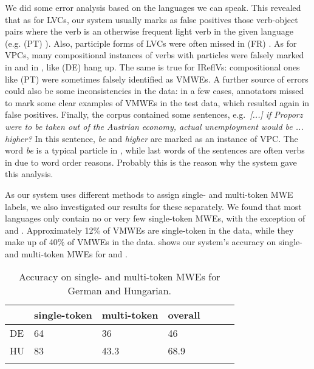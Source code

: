\documentclass[output=paper,modfonts]{langscibook}
\begin{document}
We did some error analysis based on the languages we can speak. This revealed that as for LVCs, our system usually marks as false positives those verb-object pairs where the verb is an otherwise frequent light verb in the given language (e.g. (PT) ). Also, participle forms of LVCs were often missed in (FR) . As for VPCs, many compositional instances of verbs with particles were falsely marked in  and in , like (DE)  {hang up}. The same is true for IReflVs: compositional ones like (PT)  were sometimes falsely identified as VMWEs. A further source of errors could also be some inconsistencies in the data: in a few cases, annotators missed to mark some clear examples of VMWEs in the test data, which resulted again in false positives. Finally, the  corpus contained some  sentences, e.g.~\textit{[...] if Proporz were to be taken out of the Austrian economy, actual unemployment would be ... higher?} In this sentence, \textit{be} and \textit{higher} are marked as an instance of VPC. The word \textit{be} is a typical particle in , while last words of the sentences are often verbs in  due to word order reasons. Probably this is the reason why the system gave this analysis.

As our system uses different methods to assign single- and multi-token MWE labels, we also investigated our results for these separately. We found that most languages only contain no or very few single-token MWEs, with the exception of  and . Approximately 12\% of VMWEs are single-token in the  data, while they make up of 40\% of VMWEs in the  data.  shows our system's accuracy on single- and multi-token MWEs for  and .

\begin{table}
\centering
\caption{Accuracy on single- and multi-token MWEs for German and Hungarian.}
\label{singletokenresults}
\begin{tabular}{lllllll}
  \lsptoprule
  & single-token & multi-token & overall  \\
 \midrule
 DE  & 64 & 36 & 46   \\
HU  & 83  & 43.3 & 68.9 \\
  \lspbottomrule
\end{tabular}
\end{table}
\end{document}
